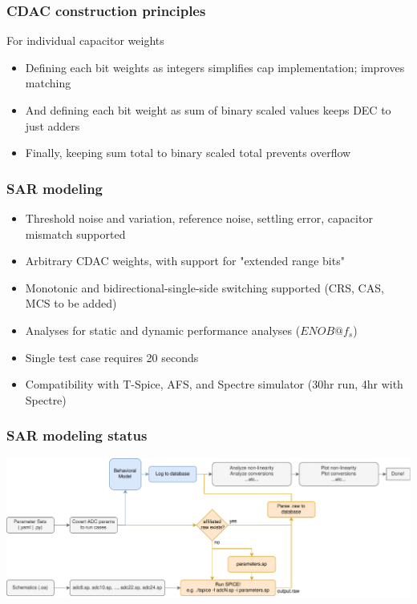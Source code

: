 \documentclass[aspectratio=169]{beamer}
\begin{document}
\begin{frame}
  \frametitle{CDAC construction principles}
  For individual capacitor weights
  \begin{itemize}
    \item Defining each bit weights as integers simplifies cap implementation; improves matching
    \item And defining each bit weight as sum of binary scaled values keeps DEC to just adders
    \item Finally, keeping sum total to binary scaled total prevents overflow
  \end{itemize}
  \end{frame}


\begin{frame}
  \frametitle{SAR modeling}
  \begin{itemize}
    \item Threshold noise and variation, reference noise, settling error, capacitor mismatch supported
    \item Arbitrary CDAC weights, with support for "extended range bits"
    \item Monotonic and bidirectional-single-side switching supported (CRS, CAS, MCS to be added)
    \item Analyses for static and dynamic performance analyses ($ENOB @ f_{s}$)
    \item Single test case requires 20 seconds
    \item Compatibility with T-Spice, AFS, and Spectre simulator (30hr run, 4hr with Spectre)
  \end{itemize}

\end{frame}
\begin{frame}
    \frametitle{SAR modeling status}
  \includegraphics[width=\textwidth]{workflow.pdf}
\end{frame}
\end{document}
